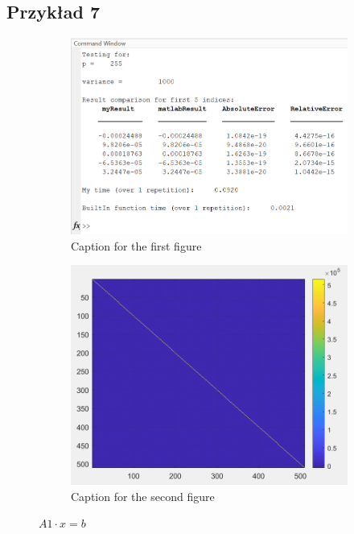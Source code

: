 \documentclass{article}
\begin{document}
    \newpage
    \subsection*{Przykład 7}
    \vspace{12pt}
    \begin{figure}[hbt!]
        \centering

        \begin{subfigure}{0.45\linewidth}
            \includegraphics[width=\linewidth]{img/fig7.png}
            \caption{Caption for the first figure}
        \end{subfigure}
        \hfill
        \begin{subfigure}{0.45\linewidth}
            \includegraphics[width=\linewidth]{img/mat7.png}
            \caption{Caption for the second figure}
        \end{subfigure}

        \caption{$A1 \cdot x = b$}
        \label{fig:example7}
    \end{figure}
    
    \newpage
\end{document}
